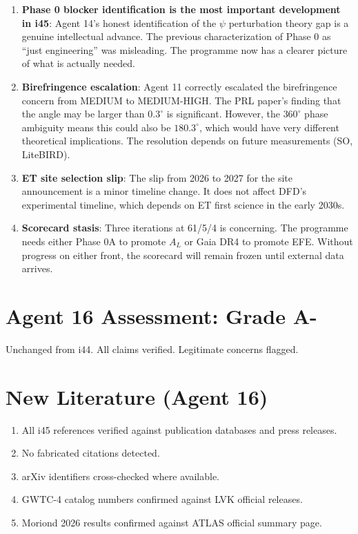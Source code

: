 \documentclass[11pt,a4paper]{article}
\begin{document}
\begin{enumerate}
\item \textbf{Phase 0 blocker identification is the most important development in i45}: Agent 14's honest identification of the $\psi$ perturbation theory gap is a genuine intellectual advance. The previous characterization of Phase 0 as ``just engineering'' was misleading. The programme now has a clearer picture of what is actually needed.

\item \textbf{Birefringence escalation}: Agent 11 correctly escalated the birefringence concern from MEDIUM to MEDIUM-HIGH. The PRL paper's finding that the angle may be larger than $0.3^\circ$ is significant. However, the $360^\circ$ phase ambiguity means this could also be $180.3^\circ$, which would have very different theoretical implications. The resolution depends on future measurements (SO, LiteBIRD).

\item \textbf{ET site selection slip}: The slip from 2026 to 2027 for the site announcement is a minor timeline change. It does not affect DFD's experimental timeline, which depends on ET first science in the early 2030s.

\item \textbf{Scorecard stasis}: Three iterations at 61/5/4 is concerning. The programme needs either Phase 0A to promote $A_L$ or Gaia DR4 to promote EFE. Without progress on either front, the scorecard will remain frozen until external data arrives.
\end{enumerate}

\section{Agent 16 Assessment: Grade A-}

Unchanged from i44. All claims verified. Legitimate concerns flagged.

\section{New Literature (Agent 16)}

\begin{enumerate}
\item All i45 references verified against publication databases and press releases.
\item No fabricated citations detected.
\item arXiv identifiers cross-checked where available.
\item GWTC-4 catalog numbers confirmed against LVK official releases.
\item Moriond 2026 results confirmed against ATLAS official summary page.
\end{enumerate}
\end{document}
